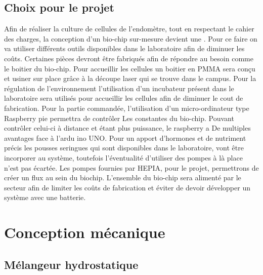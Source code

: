\documentclass[a4paper, 11pt]{article}
\begin{document}
\subsection{Choix pour le projet}
Afin de réaliser la culture de cellules de l'endomètre, tout en respectant le cahier
des charges, la conception d'un bio-chip sur-mesure devient une . Pour ce faire on va utiliser différents
outils disponibles dans le laboratoire afin de diminuer les coûts. Certaines pièces devront être
fabriqués afin de répondre au besoin comme le boitier du bio-chip.
Pour accueillir les cellules un boitier en PMMA sera conçu et usiner sur
place grâce à la découpe laser qui se trouve dans le campus.
Pour la régulation de l'environnement l'utilisation d'un incubateur présent dans le laboratoire sera
utilisés pour accueillir les cellules afin de diminuer le cout de fabrication.
Pour la partie commandée, l'utilisation d'un micro-ordinateur type Raspberry pie permettra de contrôler
Les constantes du bio-chip. Pouvant contrôler celui-ci à distance et étant plus puissance, le raspberry a
De multiples avantages face à l'ardu ino UNO.
Pour un apport d'hormones et de nutriment précis les pousses seringues qui sont disponibles
dans le laboratoire, vont être incorporer au système, toutefois l'éventualité d'utiliser des pompes à là
place n'est pas écartée.
Les pompes fournies par HEPIA, pour le projet, permettrons de créer un flux au sein du biochip.
L'ensemble du bio-chip sera alimenté par le secteur afin de limiter les coûts de fabrication et éviter
de devoir développer un système avec une batterie.

\newpage
\section{Conception mécanique}
\subsection{Mélangeur hydrostatique}
\end{document}
